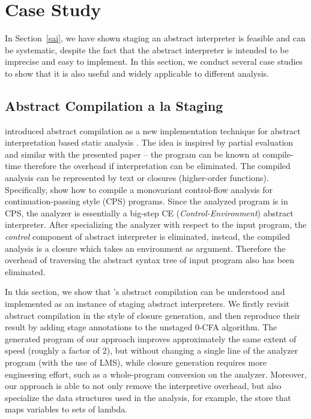 \section{Case Study} \label{cases_study}

In Section~\ref{sai}, we have shown staging an abstract interpreter is feasible and can be 
systematic, despite the fact that the abstract interpreter is intended to be imprecise and easy to implement. 
In this section, we conduct several case studies to show that it is also useful and widely
applicable to different analysis.

\subsection{Abstract Compilation a la Staging}

\citeauthor{Boucher:1996:ACN:647473.727587} introduced abstract compilation as a new
implementation technique for abstract interpretation based static analysis \cite{Boucher:1996:ACN:647473.727587}.
The idea is inspired by partial evaluation and similar with the presented paper -- the program can be known 
at compile-time therefore the overhead if interpretation can be eliminated. The compiled analysis
can be represented by text or closures (higher-order functions).
Specifically, \citeauthor{Boucher:1996:ACN:647473.727587} show how to compile a monovariant control-flow 
analysis \cite{Shivers:1991:SSC:115865.115884, Shivers:1988:CFA:53990.54007} 
for continuation-passing style (CPS) programs. Since the analyzed program is in CPS, the analyzer 
is essentially a big-step CE (\textit{Control-Environment}) abstract interpreter.
After specializing the analyzer with respect to the input program, the \textit{control} component of 
abstract interpreter is eliminated, instead, the compiled analysis is a closure which takes an 
environment as argument. Therefore the overhead of traversing the abstract syntax tree of input 
program also has been eliminated.

In this section, we show that \citeauthor{Boucher:1996:ACN:647473.727587}'s abstract compilation can be 
understood and implemented as an instance of staging abstract interpreters.
We firstly revisit abstract compilation in the style of closure generation,
and then reproduce their result by adding stage annotations to the unstaged 0-CFA algorithm.
The generated program of our approach improves approximately the same extent of speed (roughly a factor of 2),
but without changing a single line of the analyzer program (with the use of LMS), 
while closure generation requires more engineering effort, such as a whole-program 
conversion on the analyzer. Moreover, our approach is able to not only remove the interpretive
overhead, but also specialize the data structures used in the analysis, for example, the store
that maps variables to sets of lambda.

